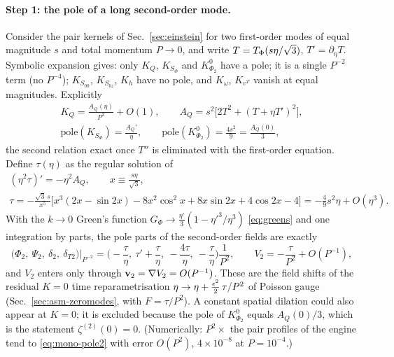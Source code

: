 \paragraph{Step 1: the pole of a long second-order mode.}  Consider the pair kernels of Sec.~\ref{sec:einstein} for two first-order modes of equal
magnitude $s$ and total momentum $P\to0$, and write $T=T_\Phi(s\eta/\sqrt3)$, $T'=\partial_\eta T$.  Symbolic expansion gives: only $K_Q$, $K_{S_\Phi}$
and $K^0_{\Phi_2}$ have a pole; it is a single $P^{-2}$ term (no $P^{-4}$); $K_{S_{00}}$, $K_{S_{0z}}$, $K_h$ have no pole, and $K_\omega$, $K_{v^T}$ vanish at
equal magnitudes.  Explicitly
\begin{equation}
\begin{gathered}K_Q=\frac{A_Q(\eta)}{P^2}+O(1),\qquad A_Q=s^2\big[2T^2+(T+\eta T')^2\big],\\
\text{pole}(K_{S_\Phi})=\frac{A_Q'}{\eta},\qquad \text{pole}(K^0_{\Phi_2})=\frac{4s^2}{9}=\frac{A_Q(0)}3,\end{gathered}
\label{eq:mono-AQ}
\end{equation}
the second relation exact once $T''$ is eliminated with the first-order equation.  Define $\tau(\eta)$ as the regular solution of
\begin{equation}
\begin{gathered}(\eta^2\tau)'=-\eta^2A_Q,\qquad x\equiv\frac{s\eta}{\sqrt3},\\
\tau=-\frac{\sqrt3\,s}{x^5}\big[x^3(2x-\sin2x)-8x^2\cos^2x+8x\sin2x+4\cos2x-4\big]=-\tfrac49s^2\eta+O(\eta^3).\end{gathered}
\label{eq:mono-tau}
\end{equation}
With the $k\to0$ Green's function $G_\Phi\to\tfrac{\eta'}3(1-{\eta'}^3/\eta^3)$ \eqref{eq:greens} and one integration by parts, the pole parts of the
second-order fields are exactly
\begin{equation}
\big(\Phi_2,\ \Psi_2,\ \delta_2,\ \delta_{T2}\big)\Big|_{P^{-2}}=\Big(-\frac\tau\eta,\ \tau'+\frac\tau\eta,\ -\frac{4\tau}\eta,\ -\frac\tau\eta\Big)\frac1{P^2},\qquad
V_2=-\frac{\tau}{P^2}+O(P^{-1}),
\label{eq:mono-pole2}
\end{equation}
and $V_2$ enters only through $\mathbf v_2=\nabla V_2=O(P^{-1})$.  These are the field shifts of the residual $K=0$ time reparametrisation
$\eta\to\eta+\tfrac{\epsilon^2}2\,\tau/P^2$ of Poisson gauge (Sec.~\ref{sec:asm-zeromodes}, with $F=\tau/P^2$).  A constant spatial dilation could also
appear at $K=0$; it is excluded because the pole of $K^0_{\Phi_2}$ equals $A_Q(0)/3$, which is the statement $\zeta^{(2)}(0)=0$.  (Numerically:
$P^2\times$ the pair profiles of the engine tend to \eqref{eq:mono-pole2} with error $O(P^2)$, $4\times10^{-8}$ at $P=10^{-4}$.)

